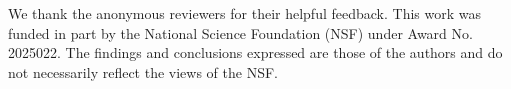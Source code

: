 \begin{acks}
We thank the anonymous reviewers for their helpful feedback. 
This work was funded in part by the National Science Foundation (NSF) under Award No. 2025022. The findings and conclusions expressed are those of the authors and do not necessarily reflect the views of the NSF.
\end{acks}
